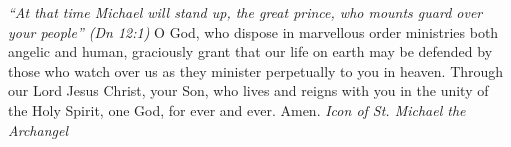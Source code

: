 \pagestyle{empty}
\hspace{0pt}
\vfill

\textit{``At that time Michael will stand up, the great prince, who
mounts guard over your people'' (Dn 12:1)}
\medbreak
O God, who dispose in marvellous order ministries both angelic and human, graciously grant that our life on earth may be defended by those who watch over us as they minister perpetually to you in heaven. Through our Lord Jesus Christ, your Son, who lives and reigns with you in the unity of the Holy Spirit, one God, for ever and ever. Amen.
\vfill
\textit{Icon of St. Michael the Archangel}
\hspace{0pt}
\newpage
